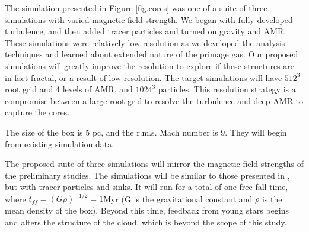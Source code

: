 The simulation presented in Figure \ref{fig.cores} was one of a suite of three
simulations with varied magnetic field strength.  We began with fully developed
turbulence, and then added tracer particles and turned on gravity and AMR.  These simulations were
relatively low resolution as we developed the analysis techniques and learned
about extended nature of the primage gas. Our proposed simulations will greatly improve the resolution
to explore if these structures are in fact fractal, or a result of low
resolution. 
The target simulations will have $512^3$ root grid and 4 levels of
AMR, and $1024^3$ particles.  This resolution strategy is a compromise between
a large root grid to resolve the turbulence and deep AMR to capture the cores.  

The size of the box is 5 pc, and the r.m.s. Mach number is 9.  They
will begin from existing simulation data.  

The proposed suite of three simulations will mirror the magnetic field strengths
of the preliminary studies.  The simulations will be similar to those presented
in \citep{Collins12}, but with tracer particles and sinks.
It will run for a total of one free-fall time, where $t_{ff}=(G
\rho)^{-1/2}=1$Myr (G is the gravitational constant and $\rho$ is the mean
density of the box).  Beyond this time, feedback from young stars begins and
alters the structure of the cloud, which is beyond the scope of this study. 

